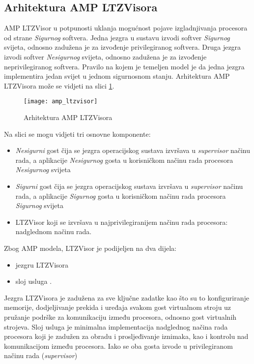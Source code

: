 \documentclass[times, utf8, diplomski, numeric]{fer}
\begin{document}
\subsection{Arhitektura AMP LTZVisora}
AMP LTZVisor u potpunosti uklanja mogućnost pojave izgladnjivanja procesora od strane \textit{Sigurnog} softvera. Jedna jezgra
u sustavu izvodi softver \textit{Sigurnog} svijeta, odnosno zadužena je za izvođenje privilegiranog softvera. Druga jezgra
izvodi softver \textit{Nesigurnog} svijeta, odnosno zadužena je za izvođenje neprivilegiranog softvera. Pravilo na kojem je
temeljen model je da jedna jezgra implementira jedan svijet u jednom sigurnosnom stanju. Arhitektura AMP LTZVisora može se
vidjeti na slici \ref{amp_ltzvisor}.
\begin{figure}[H]
  \centering
  \texttt{[image: amp\_ltzvisor]}
  \caption{Arhitektura AMP LTZVisora \cite{amp_ltzvisor}}
  \label{amp_ltzvisor}
\end{figure}
Na slici se mogu vidjeti tri osnovne komponente:
\begin{itemize}
  \item {\textit{Nesigurni} gost čija se jezgra operacijskog sustava izvršava u \textit{supervisor} načinu rada, a aplikacije
  \textit{Nesigurnog} gosta u korisničkom načinu rada procesora \textit{Nesigurnog} svijeta}
  \item{\textit{Sigurni} gost čija se jezgra operacijskog sustava izvršava u \textit{supervisor} načinu rada, a aplikacije
  \textit{Sigurnog} gosta u korisničkom načinu rada procesora \textit{Sigurnog} svijeta}
  \item{LTZVisor koji se izvršava u najprivilegiranijem načinu rada procesora: nadglednom načinu rada.}
\end{itemize}
\newpage
Zbog AMP modela, LTZVisor je podijeljen na dva dijela:
\begin{itemize}
  \item {jezgru LTZVisora}
  \item{sloj usluga .}
\end{itemize}
Jezgra LTZVisora je zadužena za sve ključne zadatke kao što su to konfiguriranje memorije, dodjeljivanje prekida i uređaja
svakom gost virtualnom stroju uz pružanje podrške za komunikaciju između procesora, odnosno gost virtualnih strojeva.
Sloj usluga je minimalna implementacija nadglednog načina rada procesora koji je zadužen za obradu i prosljeđivanje iznimaka,
kao i kontrolu nad komunikacijom između procesora. Iako se oba gosta izvode u privilegiranom načinu rada (\textit{supervisor})
\end{document}
